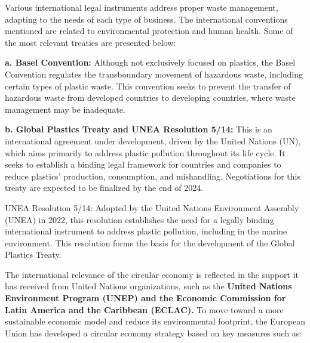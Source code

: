 \documentclass[
  12pt,
  oneside]{book}
\begin{document}
Various international legal instruments address proper waste management,
adapting to the needs of each type of business. The international
conventions mentioned are related to environmental protection and human
health. Some of the most relevant treaties are presented below:

\textbf{a. Basel Convention: }Although not exclusively focused on
plastics, the Basel Convention regulates the transboundary movement of
hazardous waste, including certain types of plastic waste. This
convention seeks to prevent the transfer of hazardous waste from
developed countries to developing countries, where waste management may
be inadequate.

\textbf{b. Global Plastics Treaty and UNEA Resolution 5/14: }This is an
international agreement under development, driven by the United Nations
(UN), which aims primarily to address plastic pollution throughout its
life cycle. It seeks to establish a binding legal framework for
countries and companies to reduce plastics' production, consumption, and
mishandling. Negotiations for this treaty are expected to be finalized
by the end of 2024.

UNEA Resolution 5/14: Adopted by the United Nations Environment Assembly
(UNEA) in 2022, this resolution establishes the need for a legally
binding international instrument to address plastic pollution, including
in the marine environment. This resolution forms the basis for the
development of the Global Plastics Treaty.

The international relevance of the circular economy is reflected in the
support it has received from United Nations organizations, such as the
\textbf{United Nations Environment Program (UNEP) and the Economic
Commission for Latin America and the Caribbean (ECLAC). }To move toward
a more sustainable economic model and reduce its environmental
footprint, the European Union has developed a circular economy strategy
based on key measures such as:
\end{document}
